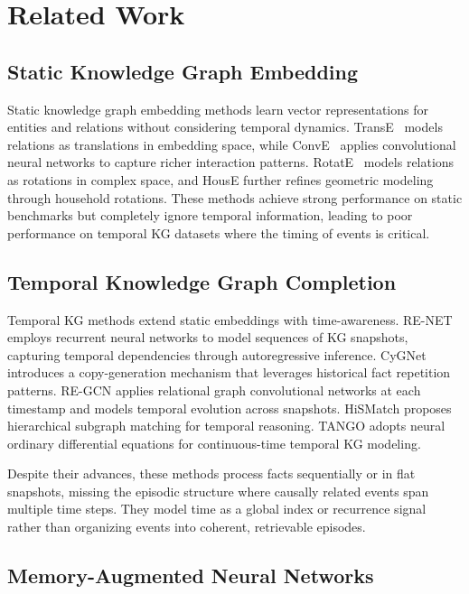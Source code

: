 \documentclass{article}
\begin{document}
\section{Related Work}
\label{sec:related}

\subsection{Static Knowledge Graph Embedding}

Static knowledge graph embedding methods learn vector representations for entities and relations without considering temporal dynamics. TransE~\citep{bordes2013transe} models relations as translations in embedding space, while ConvE~\citep{dettmers2018conve} applies convolutional neural networks to capture richer interaction patterns. RotatE~\citep{sun2019rotate} models relations as rotations in complex space, and HousE further refines geometric modeling through household rotations. These methods achieve strong performance on static benchmarks but completely ignore temporal information, leading to poor performance on temporal KG datasets where the timing of events is critical.

\subsection{Temporal Knowledge Graph Completion}

Temporal KG methods extend static embeddings with time-awareness. RE-NET~\citep{jin2020renet} employs recurrent neural networks to model sequences of KG snapshots, capturing temporal dependencies through autoregressive inference. CyGNet~\citep{zhu2021cygnet} introduces a copy-generation mechanism that leverages historical fact repetition patterns. RE-GCN applies relational graph convolutional networks at each timestamp and models temporal evolution across snapshots. HiSMatch proposes hierarchical subgraph matching for temporal reasoning. TANGO adopts neural ordinary differential equations for continuous-time temporal KG modeling.

Despite their advances, these methods process facts sequentially or in flat snapshots, missing the episodic structure where causally related events span multiple time steps. They model time as a global index or recurrence signal rather than organizing events into coherent, retrievable episodes.

\subsection{Memory-Augmented Neural Networks}
\end{document}
